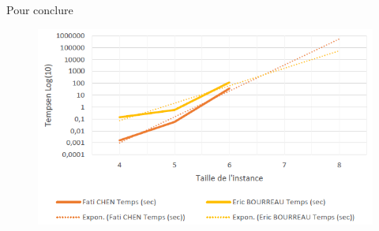 	\begin{frame}{Pour conclure}
		\begin{figure}
			\includegraphics[width=\textwidth]{images/resultat_bruteforce_rowscan}
		\end{figure}
	\end{frame}
